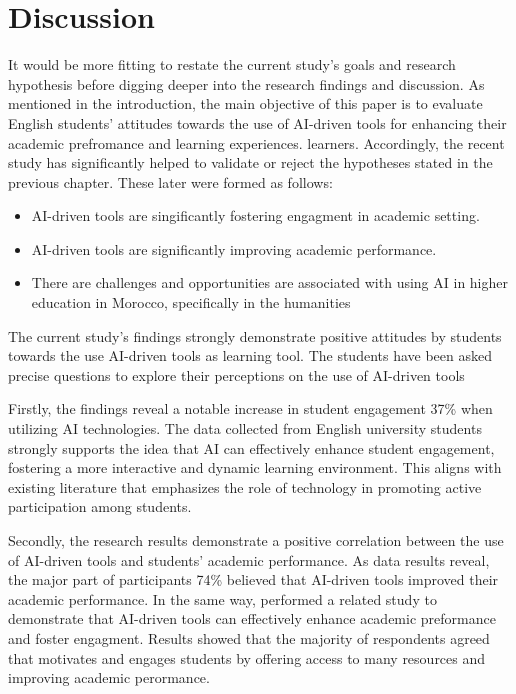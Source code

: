 \section{Discussion}
It would be more fitting to restate the current study’s goals and research hypothesis
before digging deeper into the research findings and discussion. As mentioned in the
introduction, the main objective of this paper is to evaluate English students’ attitudes towards the
use of AI-driven tools for enhancing their academic prefromance and learning experiences.
learners. Accordingly, the recent study has significantly helped
to validate or reject the hypotheses stated in the previous chapter.
These later were formed as follows:
\begin{itemize}
	\item AI-driven tools are singificantly fostering engagment in academic setting.
	\item AI-driven tools are significantly improving academic performance.
	\item There are challenges and opportunities are associated with using AI in higher education
	      in Morocco, specifically in the humanities
\end{itemize}
The current study’s findings strongly demonstrate positive attitudes by students towards
the use AI-driven tools as learning tool. The students have been asked precise questions
to explore their perceptions on the use of AI-driven tools

Firstly, the findings reveal a notable increase in student engagement 37\% when 
utilizing AI technologies. The data collected from English university students
strongly supports the idea that AI can effectively enhance student engagement,
fostering a more interactive and dynamic learning environment. This aligns with
existing literature that emphasizes the role of technology in promoting active
participation among students.

Secondly, the research results demonstrate a positive correlation between the use of AI-driven tools and students' academic performance. 
As data results reveal, the major part of participants 74\% believed that AI-driven tools
improved their academic performance. In the same way, 
\citep{mohammed_exploring_2023} performed a related study
to demonstrate that AI-driven tools can effectively enhance 
academic preformance and foster engagment. Results showed
that the majority of respondents agreed that  
motivates and engages students by offering access to 
many resources and improving academic perormance. 

